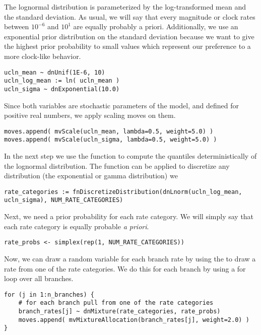 The lognormal distribution is parameterized by the log-transformed mean and the standard deviation.
As usual, we will say that every magnitude or clock rates between $10^{-6}$ and $10^{1}$ are equally probably a priori.
Additionally, we use an exponential prior distribution on the standard deviation because we want to give the highest prior probability to small values which represent our preference to a more clock-like behavior.
{\tt \begin{snugshade*}
\begin{lstlisting}
ucln_mean ~ dnUnif(1E-6, 10)
ucln_log_mean := ln( ucln_mean )
ucln_sigma ~ dnExponential(10.0)
\end{lstlisting}
\end{snugshade*}}
Since both variables are stochastic parameters of the model, and defined for positive real numbers, we apply scaling moves on them.
{\tt \begin{snugshade*}
\begin{lstlisting}moves.append( mvScale(ucln_mean, lambda=0.5, weight=5.0) )
moves.append( mvScale(ucln_sigma, lambda=0.5, weight=5.0) )
\end{lstlisting}
\end{snugshade*}}
In the next step we use the function  to compute the quantiles deterministically of the lognormal distribution.
The  function can be applied to discretize any distribution (\EG the exponential or gamma distribution) we
{\tt \begin{snugshade*}
\begin{lstlisting}
rate_categories := fnDiscretizeDistribution(dnLnorm(ucln_log_mean, ucln_sigma), NUM_RATE_CATEGORIES)
\end{lstlisting}
\end{snugshade*}}
Next, we need a prior probability for each rate category.
We will simply say that each rate category is equally probable \emph{a priori}.
{\tt \begin{snugshade*}
\begin{lstlisting}
rate_probs <- simplex(rep(1, NUM_RATE_CATEGORIES))
\end{lstlisting}
\end{snugshade*}}
Now, we can draw a random variable for each branch rate by using the  to draw a rate from one of the rate categories.
We do this for each branch by using a for loop over all branches.
{\tt \begin{snugshade*}
\begin{lstlisting}
for (j in 1:n_branches) {
    # for each branch pull from one of the rate categories
    branch_rates[j] ~ dnMixture(rate_categories, rate_probs)
    moves.append( mvMixtureAllocation(branch_rates[j], weight=2.0) )
}
\end{lstlisting}
\end{snugshade*}}
